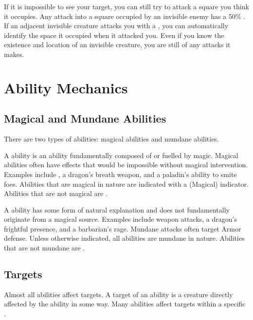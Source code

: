             If it is impossible to see your target, you can still try to attack a square you think it occupies.
            Any  attack into a square occupied by an invisible enemy has a 50\% .
            If an adjacent invisible creature attacks you with a , you can automatically identify the space it occupied when it attacked you.
            Even if you know the existence and location of an invisible creature, you are still \partiallyunaware of any attacks it makes.

\section{Ability Mechanics}\label{Ability Mechanics}

    \subsection{Magical and Mundane Abilities}\label{Magical and Mundane Abilities}

        There are two types of abilities: magical abilities and mundane abilities.

        \label{Magical Abilities} A  ability is an ability fundamentally composed of or fuelled by magic.
        Magical abilities often have effects that would be impossible without magical intervention.
        Examples include , a dragon's breath weapon, and a paladin's ability to smite foes.
        Abilities that are magical in nature are indicated with a (Magical) indicator.
        Abilities that are not magical are .

        \label{Mundane Abilities} A  ability has some form of natural explanation and does not fundamentally originate from a magical source.
        Examples include weapon attacks, a dragon's frightful presence, and a barbarian's rage.
        Mundane attacks often target Armor defense.
        Unless otherwise indicated, all abilities are mundane in nature.
        Abilities that are not mundane are .

    \subsection{Targets}\label{Targets}
        Almost all abilities affect targets.
        A target of an ability is a creature directly affected by the ability in some way.
        Many abilities affect targets within a specific .

